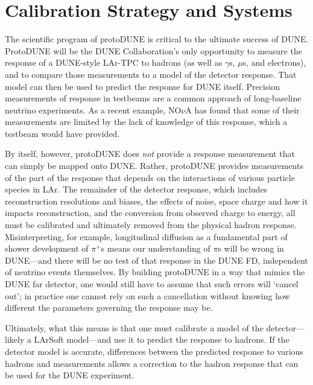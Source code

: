 
\section{Calibration Strategy and Systems}


	The scientific program of protoDUNE is critical to the ultimate success
of DUNE.  ProtoDUNE will be the DUNE Collaboration's only opportunity to
measure the response of a DUNE-style LAr-TPC to hadrons (as well as $\gamma$s,
$\mu$s, and electrons), and to compare those measurements to a model of the
detector response. That model can then be used to predict the response for DUNE
itself.  Precision measurements of response in testbeams are a common approach
of long-baseline neutrino experiments. As a recent example, NO{$\nu$}A has
found that some of their measurements are limited by the lack of knowledge of
this response, which a testbeam would have provided.
	
	By itself, however, protoDUNE does {\it not} provide a response
measurement that can simply be mapped onto DUNE.  Rather, protoDUNE provides
measurements of the part of the response that depends on the interactions of
various particle species in LAr.  The remainder of the detector response, which
includes reconstruction resolutions and biases, the effects of noise, space
charge and how it impacts reconstruction, and the conversion from observed
charge to energy, all must be calibrated and ultimately removed from the
physical hadron response.  Misinterpreting, for example, longitudinal diffusion
as a fundamental part of shower development of $\pi^+$s means our understanding
of $\pi$s will be wrong in DUNE---and there will be no test of that response in
the DUNE FD, independent of neutrino events themselves.  By building protoDUNE
in a way that mimics the DUNE far detector, one would still have to assume that such errors will
`cancel out';
 in practice one cannot rely on such a cancellation without knowing
how different the parameters governing the response may be.

	Ultimately, what this means is that one must calibrate a model of the
detector---likely a LArSoft model---and use it to predict the response to
hadrons.  If the detector model is accurate, differences between the predicted
response to various hadrons and measurements allows a correction to the hadron
response that can be used for the DUNE experiment.  

